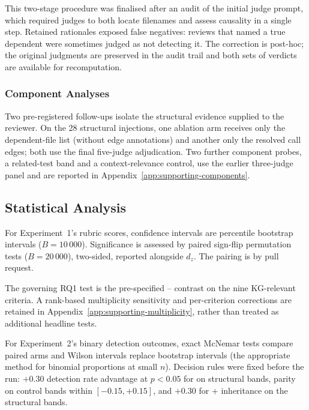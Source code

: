 This two-stage procedure was finalised after an audit of the initial judge
prompt, which required judges to both locate filenames and assess causality in
a single step. Retained rationales exposed false negatives: reviews that
named a true dependent were sometimes judged as not detecting it. The
correction is post-hoc; the original judgments are preserved in the audit
trail and both sets of verdicts are available for recomputation.

\subsubsection{Component Analyses}

Two pre-registered follow-ups isolate the structural evidence supplied to the
reviewer. On the 28 structural injections, one ablation arm receives only the
dependent-file list (without edge annotations) and another only the resolved
call edges; both use the final five-judge adjudication. Two further
component probes, a related-test band and a context-relevance control, use
the earlier three-judge panel and are reported in
Appendix~\ref{app:supporting-components}.

\subsection{Statistical Analysis}
\label{sec:stats}

For Experiment~1's rubric scores, confidence intervals are percentile
bootstrap intervals ($B = 10\,000$).
Significance is assessed by paired sign-flip permutation tests
($B = 20\,000$), two-sided, reported alongside $d_z$. The pairing is by pull
request.

The governing RQ1 test is the pre-specified \kg{}--\baseline{} contrast on the
nine KG-relevant criteria. A rank-based multiplicity sensitivity and
per-criterion corrections are retained in
Appendix~\ref{app:supporting-multiplicity}, rather than treated as additional
headline tests.

For Experiment~2's binary detection outcomes, exact McNemar tests compare
paired arms and Wilson intervals replace bootstrap intervals (the appropriate
method for binomial proportions at small $n$).
Decision rules were fixed before the run: $+0.30$ detection
rate advantage at $p < 0.05$ for \kg{} on structural bands, parity on control
bands within $[-0.15, +0.15]$, and $+0.30$ for \kg{} + inheritance on the
structural bands.
